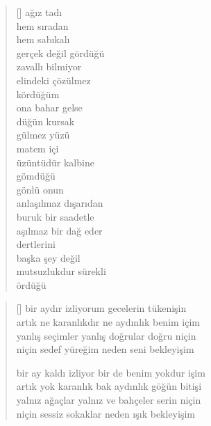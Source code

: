 \documentclass[10pt, openright, twoside]{memoir}
\theoremstyle{definition}
\begin{document}
\vspace*{\fill}
%
\newpage
{}
\vspace*{\fill}
\settowidth{\versewidth}{gerçek değil gördüğü}
\begin{verse}[\versewidth]
  ağız tadı \\
  hem sıradan \\
  hem sabıkalı \\
  gerçek değil gördüğü \\
  zavallı bilmiyor \\
  elindeki çözülmez \\
  kördüğüm \\
  ona bahar gelse \\
  düğün kursak \\
  gülmez yüzü \\
  matem içi \\
  üzüntüdür kalbine \\
  gömdüğü \\
  gönlü onun \\
  anlaşılmaz dışarıdan \\
  buruk bir saadetle \\
  aşılmaz bir dağ eder \\
  dertlerini \\
  başka şey değil \\
  mutsuzlukdur sürekli \\
  ördüğü \\
\end{verse}
\vspace*{\fill}
%
\newpage
{}
\vspace*{\fill}
\settowidth{\versewidth}{bir ay kaldı izliyor bir de benim yokdur işim}
\begin{verse}[\versewidth]
  bir aydır izliyorum gecelerin tükenişin \\
  artık ne karanlıkdır ne aydınlık benim içim \\
  yanlış seçimler yanlış doğrular doğru niçin \\
  niçin sedef yüreğim neden seni bekleyişim

  bir ay kaldı izliyor bir de benim yokdur işim \\
  artık yok karanlık bak aydınlık göğün bitişi \\
  yalnız ağaçlar yalnız ve bahçeler serin niçin \\
  niçin sessiz sokaklar neden ışık bekleyişim \\
\end{verse}
\end{document}
